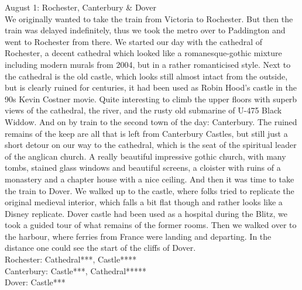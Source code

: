 August 1: Rochester, Canterbury \& Dover\\
We originally wanted to take the train from Victoria to Rochester. But then the train was delayed indefinitely, thus we took the metro over to Paddington and went to Rochester from there. We started our day with the cathedral of Rochester, a decent cathedral which looked like a romanesque-gothic mixture including modern murals from 2004, but in a rather romanticised style. Next to the cathedral is the old castle, which looks still almost intact from the outside, but is clearly ruined for centuries, it had been used as Robin Hood's castle in the 90s Kevin Costner movie. Quite interesting to climb the upper floors with superb views of the cathedral, the river, and the rusty old submarine of U-475 Black Widdow. And on by train to the second town of the day: Canterbury. The ruined remains of the keep are all that is left from Canterbury Castles, but still just a short detour on our way to the cathedral, which is the seat of the spiritual leader of the anglican church. A really beautiful impressive gothic church, with many tombs, stained glass windows and beautiful screens, a cloister with ruins of a monastery and a chapter house with a nice ceiling. And then it was time to take the train to Dover. We walked up to the castle, where folks tried to replicate the original medieval interior, which falls a bit flat though and rather looks like a Disney replicate. Dover castle had been used as a hospital during the Blitz, we took a guided tour of what remains of the former rooms. Then we walked over to the harbour, where ferries from France were landing and departing. In the distance one could see the start of the cliffs of Dover.\\

Rochester: Cathedral***, Castle****\\
Canterbury: Castle***, Cathedral*****\\
Dover: Castle***\\

